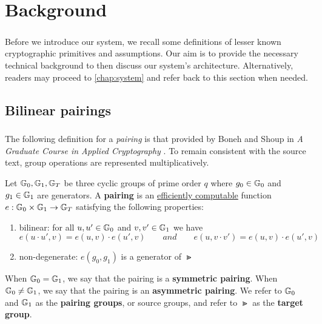 \chapter{Background}
\label{chap:background}


\paragraph{} Before we introduce our system, we recall some definitions of lesser known cryptographic primitives and assumptions. Our aim is to provide the necessary technical background to then discuss our system's architecture. Alternatively, readers may proceed to \autoref{chap:system} and refer back to this section when needed.




\section{Bilinear pairings}

\paragraph{} The following definition for a \textit{pairing} is that provided by Boneh and Shoup in \textit{A Graduate Course in Applied Cryptography} \cite{BonehShoup}. To remain consistent with the source text, group operations are represented multiplicatively.

\begin{definition}
\label{def:pairing}
	Let $\mathbb{G}_0, \mathbb{G}_1, \mathbb{G}_T$ be three cyclic groups of prime order $q$ where $g_0 \in \mathbb{G}_0$ and $g_1 \in \mathbb{G}_1$ are generators. A \textbf{pairing} is an \underline{efficiently computable} function $e : \mathbb{G}_0 \times \mathbb{G}_1 \rightarrow \mathbb{G}_T$ satisfying the following properties:
	
		\begin{enumerate}
			\item bilinear: for all $u,u' \in \mathbb{G}_0$ and $v,v' \in \mathbb{G}_1$ we have
				\begin{equation}
					e(u \cdot u', v) = e(u,v) \cdot e(u',v) \qquad and \qquad e(u, v \cdot v') = e(u,v) \cdot e(u',v)
				\end{equation}
				
			\item non-degenerate: $e(g_0, g_1)$ is a generator of $\Gt$
		\end{enumerate}
		
	\noindent When $\mathbb{G}_0 = \mathbb{G}_1$, we say that the pairing is a \textbf{symmetric pairing}. When $\mathbb{G}_0 \neq \mathbb{G}_1$, we say that the pairing is an \textbf{asymmetric pairing}. We refer to $\mathbb{G}_0$ and $\mathbb{G}_1$ as the \textbf{pairing groups}, or source groups, and refer to $\Gt$ as the \textbf{target group}.
\end{definition}

